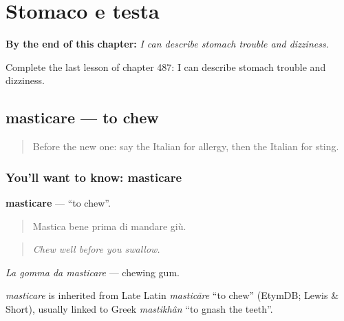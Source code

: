 
\chapter{Stomaco e testa}
\label{ch:it-stomaco-e-testa}

\begin{chapteropening}
\textbf{By the end of this chapter:} \emph{I can describe stomach trouble and dizziness.}

Complete the last lesson of chapter 487: I can describe stomach trouble and dizziness.
\end{chapteropening}

\section[masticare]{masticare — to chew}

\label{lesson:IT-C487-masticare}



\begin{quote}
Before the new one: say the Italian for allergy, then the Italian for sting.
\end{quote}

\subsection*{You'll want to know: masticare}
\textbf{masticare} — \textquotedblleft{}to chew\textquotedblright{}.

\begin{quote}
Mastica bene prima di mandare giù.
\end{quote}

\begin{quote}
\emph{Chew well before you swallow.}
\end{quote}

\emph{La gomma da masticare} — chewing gum.

\begin{cousinweb}
\emph{masticare} is inherited from Late Latin \emph{masticāre} \textquotedblleft{}to chew\textquotedblright{} (EtymDB; Lewis \& Short), usually linked to Greek \emph{mastikhân} \textquotedblleft{}to gnash the teeth\textquotedblright{}.
\end{cousinweb}

